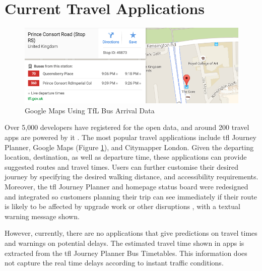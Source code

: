 \section{Current Travel Applications}

\begin{figure}
\centering
\includegraphics[width=1\textwidth]{figures/google_maps_tfl_data.png}
\caption{\label{fig:google_maps_tfl_data} Google Maps Using TfL Bus Arrival Data}
\end{figure}

Over 5,000 developers have registered for the open data\cite{open_data}, and around 200 travel apps are powered by it \cite{tfl_annual_report_13/14}. The most popular travel applications include \acrshort{tfl} Journey Planner, Google Maps (Figure \ref{fig:google_maps_tfl_data}), and Citymapper London. Given the departing location, destination, as well as departure time, these applications can provide suggested routes and travel times. Users can further customise their desired journey by specifying the desired walking distance, and accessibility requirements. Moreover, the \acrshort{tfl} Journey Planner and homepage
status board were redesigned and integrated so customers planning their trip can see immediately if their route is likely to be affected by upgrade work or other disruptions \cite{tfl_annual_report_13/14}, with a textual warning message shown.

\par However, currently, there are no applications that give predictions on travel times and warnings on potential delays. The estimated travel time shown in apps is extracted from the \acrshort{tfl} Journey Planner Bus Timetables. This information does not capture the real time delays according to instant traffic conditions.

